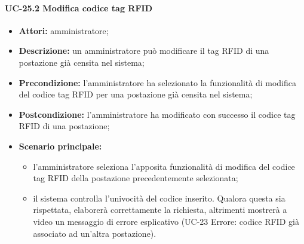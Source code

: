 \paragraph{UC-25.2 Modifica codice tag RFID}
\begin{itemize}
    \item \textbf{Attori:} amministratore;
    \item \textbf{Descrizione:} un amministratore pu\`{o} modificare il tag RFID di una postazione già censita nel sistema;
    \item \textbf{Precondizione:} l'amministratore ha selezionato la funzionalità di modifica del codice tag RFID per una postazione già censita nel sistema;
    \item \textbf{Postcondizione:} l'amministratore ha modificato con successo il codice tag RFID di una postazione;
    \item \textbf{Scenario principale:}
    \begin{itemize}
        \item l'amministratore seleziona l'apposita funzionalità di modifica del codice tag RFID della postazione precedentemente selezionata;
        \item il sistema controlla l'univocità del codice inserito. Qualora questa sia rispettata, elaborerà correttamente la richiesta, altrimenti mostrerà a video un messaggio di errore esplicativo (UC-23 Errore: codice RFID già associato ad un'altra postazione).
    \end{itemize}
\end{itemize}

 
